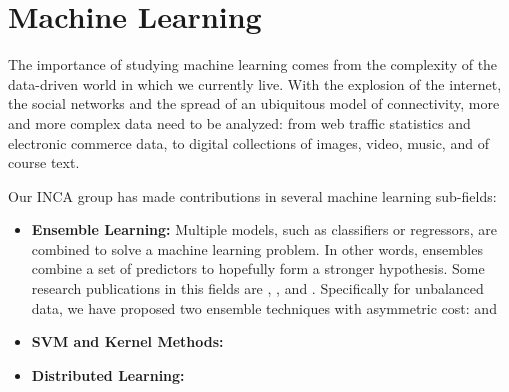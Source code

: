 \section{Machine Learning}

The importance of studying machine learning comes from the complexity of the
data-driven world in which we currently live. With the explosion of the
internet, the social networks and the spread of an ubiquitous model of
connectivity, more and more complex data need to be analyzed: from web traffic
statistics and electronic commerce data, to digital collections of images,
video, music, and of course text.

Our INCA group has made contributions in several machine learning sub-fields:
\begin{itemize}
\item \textbf{Ensemble Learning:} Multiple models, such as classifiers or regressors, are combined to solve a machine learning problem. In other words, ensembles combine a set of predictors to hopefully form a stronger hypothesis. Some research publications in this fields are \cite{NanculefVAM06}, \cite{ValleSAMF10}, \cite{FernandezVSA12} and \cite{NanculefVAM12}. Specifically for unbalanced data, we have proposed two ensemble techniques with asymmetric cost: \cite{NanculefVAM07} and \cite{OrmenoRVAA12}
\item \textbf{SVM and Kernel Methods:}
\item \textbf{Distributed Learning:}
\end{itemize}
